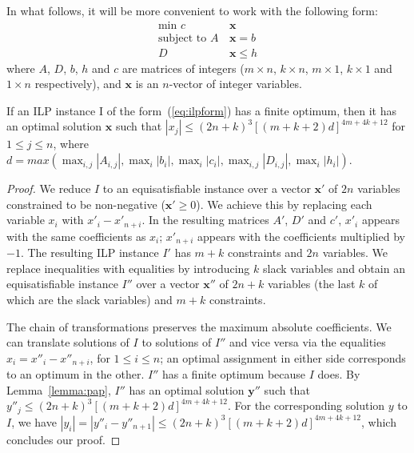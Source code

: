 \documentclass{llncs}
\begin{document}
In what follows, it will be more convenient to work with the following
form:
\begin{equation}
  \begin{aligned}
    \text{min  } c\hspace{2pt} & \mathbf{x} \\
    \text{subject to  } A\hspace{2pt} & \mathbf{x} = b \\
    D\hspace{2pt} & \mathbf{x} \leq h
  \end{aligned}
  \label{eq:ilpform}
\end{equation}
where $A$, $D$, $b$, $h$ and $c$ are matrices of integers ($m \times
n$, $k \times n$, $m \times 1$, $k \times 1$ and $1 \times n$
respectively), and $\mathbf{x}$ is an $n$-vector of integer variables.

\begin{lemma}
  If an ILP instance I of the form~(\ref{eq:ilpform}) has a finite
  optimum, then it has an optimal solution $\mathbf{x}$ such that
  $|x_j| \leq (2 n + k)^3[(m + k + 2) d]^{4 m + 4 k + 12}$ for $1 \leq
  j \leq n$, where $d = max(\max_{i, j} |A_{i,j}|, \max_i |b_i|,
  \max_i |c_i|, \max_{i,j} |D_{i,j}|, \max_i |h_i|)$.
  \label{lemma:ilpbounds}
\end{lemma}

\begin{proof}
  We reduce $I$ to an equisatisfiable instance over a vector
  $\mathbf{x'}$ of $2 n$ variables constrained to be non-negative
  ($\mathbf{x'} \geq 0$). We achieve this by replacing each variable
  $x_i$ with $x'_i - x'_{n + i}$. In the resulting matrices $A'$, $D'$
  and $c'$, $x'_i$ appears with the same coefficients as $x_i$; $x'_{n
    + i}$ appears with the coefficients multiplied by $-1$. The
  resulting ILP instance $I'$ has $m + k$ constraints and $2 n$
  variables. We replace inequalities with equalities by introducing
  $k$ slack variables and obtain an equisatisfiable instance $I''$
  over a vector $\mathbf{x''}$ of $2 n + k$ variables (the last $k$ of
  which are the slack variables) and $m + k$ constraints.

  The chain of transformations preserves the maximum absolute
  coefficients. We can translate solutions of $I$ to solutions of
  $I''$ and vice versa via the equalities $x_i = x''_i - x''_{n + i}$,
  for $1 \leq i \leq n$; an optimal assignment in either side
  corresponds to an optimum in the other.  $I''$ has a finite optimum
  because $I$ does. By Lemma~\ref{lemma:pap}, $I''$ has an optimal
  solution $\mathbf{y''}$ such that $y''_j \leq (2 n + k)^3[(m + k +
  2) d]^{4 m + 4 k + 12}$. For the corresponding solution $y$ to $I$,
  we have $|y_i| = |y''_i - y''_{n + 1}| \leq (2 n + k)^3[(m + k + 2)
  d]^{4 m + 4 k + 12}$, which concludes our proof.
\end{proof}
\end{document}
